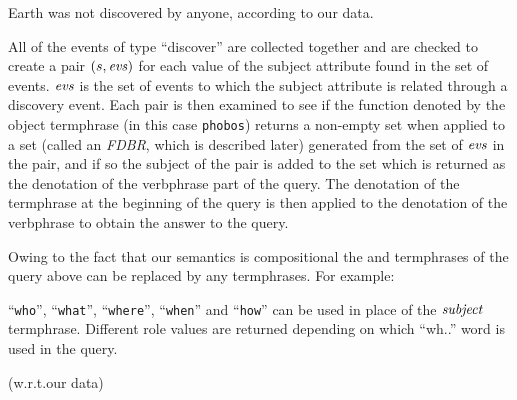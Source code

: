 \documentclass[../main.tex]{subfiles}
\begin{document}
\begin{refsection}
\examplespacing


\examplespacing

\noindent Earth was not discovered by anyone, according to our data.

\examplespacing


\examplespacing


\noindent All of the events of type ``discover'' are collected together and are checked to create a pair $(s, \operatorname{\mathit{evs}})$ for each value of the subject attribute found in the set of events. $\operatorname{\mathit{evs}}$ is the set of events to which the subject attribute is related through a discovery event.  Each pair is then examined to see if the function denoted by the object termphrase (in this case \texttt{phobos}) returns a non-empty set when applied to a set (called an \textit{FDBR}, which is described later) generated from the set of $\operatorname{\mathit{evs}}$ in the pair, and if so the subject of the pair is added to the set which is returned as the denotation of the verbphrase part of the query. The denotation of the termphrase at the beginning of the query is then applied to the denotation of the verbphrase to obtain the answer to the query. %

Owing to the fact that our semantics is compositional the  and  termphrases of the query above can be replaced by any termphrases. For example:

\examplespacing



\examplespacing

\noindent ``\texttt{who}'', ``\texttt{what}'', ``\texttt{where}'', ``\texttt{when}'' and ``\texttt{how}'' can be used in place of the $\operatorname{\mathit{subject}}$ termphrase. Different role values are returned depending on which ``wh..'' word is used in the query.

\examplespacing



 (w.r.t.our data)


\end{refsection}
\end{document}

